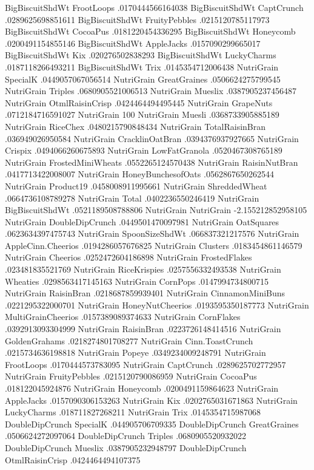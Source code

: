 BigBiscuitShdWt	FrootLoops	.0170444566164038
BigBiscuitShdWt	CaptCrunch	.0289625698851611
BigBiscuitShdWt	FruityPebbles	.0215120785117973
BigBiscuitShdWt	CocoaPus	.0181220454336295
BigBiscuitShdWt	Honeycomb	.0200491154855146
BigBiscuitShdWt	AppleJacks	.0157090299665017
BigBiscuitShdWt	Kix	.020276502838293
BigBiscuitShdWt	LuckyCharms	.0187118266493211
BigBiscuitShdWt	Trix	.0145354712006438
NutriGrain	SpecialK	.0449057067056514
NutriGrain	GreatGraines	.0506624275799545
NutriGrain	Triples	.0680905521006513
NutriGrain	Mueslix	.0387905237456487
NutriGrain	OtmlRaisinCrisp	.0424464494495445
NutriGrain	GrapeNuts	.0712184716591027
NutriGrain	100%
NutriGrain	Muesli	.0368733905885189
NutriGrain	RiceChex	.0480215790848434
NutriGrain	TotalRaisinBran	.036949026950584
NutriGrain	CracklinOatBran	.0394376937927665
NutriGrain	Crispix	.0494066260675893
NutriGrain	LowFatGranola	.0520467308765189
NutriGrain	FrostedMiniWheats	.0552265124570438
NutriGrain	RaisinNutBran	.0417713422008007
NutriGrain	HoneyBunchesofOats	.0562867650262544
NutriGrain	Product19	.0458008911995661
NutriGrain	ShreddedWheat	.0664736108789278
NutriGrain	Total	.0402236550246419
NutriGrain	BigBiscuitShdWt	.0521189508788806
NutriGrain	NutriGrain	-2.155212852958105
NutriGrain	DoubleDipCrunch	.0449501470097981
NutriGrain	OatSquares	.0623634397475743
NutriGrain	SpoonSizeShdWt	.066837321217576
NutriGrain	AppleCinn.Cheerios	.0194286057676825
NutriGrain	Clusters	.0183454861146579
NutriGrain	Cheerios	.0252472604186898
NutriGrain	FrostedFlakes	.023481835521769
NutriGrain	RiceKrispies	.0257556332493538
NutriGrain	Wheaties	.0298563417145163
NutriGrain	CornPops	.0147994734800715
NutriGrain	RaisinBran	.0218687859939401
NutriGrain	CinnamonMiniBuns	.0221295322000701
NutriGrain	HoneyNutCheerios	.0193595350187773
NutriGrain	MultiGrainCheerios	.0157389089374633
NutriGrain	CornFlakes	.0392913093304999
NutriGrain	RaisinBran	.0223726148414516
NutriGrain	GoldenGrahams	.0218274801708277
NutriGrain	Cinn.ToastCrunch	.0215734636198818
NutriGrain	Popeye	.0349234009248791
NutriGrain	FrootLoops	.0170444573783095
NutriGrain	CaptCrunch	.0289625702772957
NutriGrain	FruityPebbles	.0215120790086959
NutriGrain	CocoaPus	.018122045924876
NutriGrain	Honeycomb	.0200491159864623
NutriGrain	AppleJacks	.0157090306153263
NutriGrain	Kix	.0202765031671863
NutriGrain	LuckyCharms	.018711827268211
NutriGrain	Trix	.0145354715987068
DoubleDipCrunch	SpecialK	.044905706709335
DoubleDipCrunch	GreatGraines	.0506624272097064
DoubleDipCrunch	Triples	.0680905520932022
DoubleDipCrunch	Mueslix	.0387905232948797
DoubleDipCrunch	OtmlRaisinCrisp	.0424464494107375

